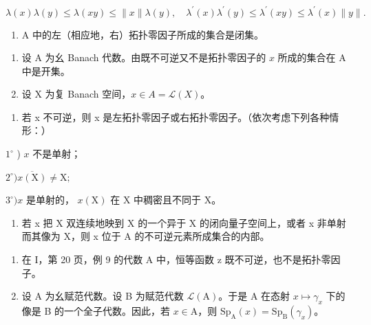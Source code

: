 \[
\lambda (x) \lambda (y) \leqslant \lambda (x y) \leqslant \| x \| \lambda (y), \quad \lambda^ {\prime} (x) \lambda^ {\prime} (y) \leqslant \lambda^ {\prime} (x y) \leqslant \lambda^ {\prime} (x) \| y \|.
\]

\begin{enumerate}
\def\labelenumi{\alph{enumi})}
\setcounter{enumi}{1}
\tightlist
\item
  A 中的左（相应地，右）拓扑零因子所成的集合是闭集。
\end{enumerate}

\begin{enumerate}
\def\labelenumi{\arabic{enumi})}
\setcounter{enumi}{17}
\item
  设 A 为幺 Banach 代数。由既不可逆又不是拓扑零因子的 \(x\) 所成的集合在 A 中是开集。
\item
  设 X 为复 Banach 空间，\(x \in A = \mathcal{L}(X)\)。
\end{enumerate}

\begin{enumerate}
\def\labelenumi{\alph{enumi})}
\tightlist
\item
  若 x 不可逆，则 x 是左拓扑零因子或右拓扑零因子。（依次考虑下列各种情形：）
\end{enumerate}

\(1^{\circ}\) ) \(x\) 不是单射；

\(2^{\circ})\overline{x(\mathrm{X})}\neq \mathrm{X};\)

\(3^{\circ}) x \text{ 是单射的， } x(\mathrm{X}) \text{ 在 X 中稠密且不同于 X。}\)

\begin{enumerate}
\def\labelenumi{\alph{enumi})}
\setcounter{enumi}{1}
\tightlist
\item
  若 x 把 X 双连续地映到 X 的一个异于 X 的闭向量子空间上，或者 x 非单射而其像为 X，则 x 位于 A 的不可逆元素所成集合的内部。
\end{enumerate}

\begin{enumerate}
\def\labelenumi{\arabic{enumi})}
\setcounter{enumi}{19}
\item
  在 I，第 20 页，例 9 的代数 A 中，恒等函数 z 既不可逆，也不是拓扑零因子。
\item
  设 A 为幺赋范代数。设 B 为赋范代数 \(\mathcal{L}(\mathrm{A})\)。于是 A 在态射 \(x \mapsto \gamma_x\) 下的像是 B 的一个全子代数。因此，若 \(x \in \mathrm{A}\)，则 \(\mathrm{Sp}_{\mathrm{A}}(x) = \mathrm{Sp}_{\mathrm{B}}(\gamma_x)\)。
\end{enumerate}

